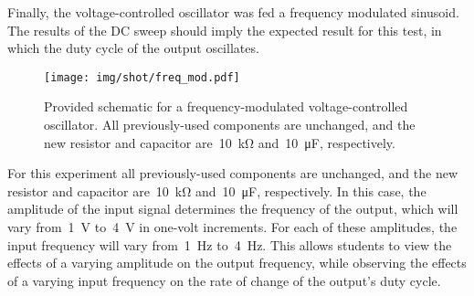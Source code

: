 Finally, the voltage-controlled oscillator was fed a frequency modulated
sinusoid.  The results of the DC sweep should imply the expected result for
this test, in which the duty cycle of the output oscillates.
%
\begin{figure}[H]
	\centering
	\texttt{[image: img/shot/freq\_mod.pdf]}
	\parbox{.6\textwidth}{
	\caption{Provided schematic for a frequency-modulated voltage-controlled
	oscillator.  All previously-used components are unchanged, and the new
	resistor and capacitor are~\SI{10}{\kilo\ohm} and~\SI{10}{\micro\farad},
	respectively.}
	\label{fig:freq_mod}}
\end{figure}
%
For this experiment all previously-used components are unchanged, and the new
resistor and capacitor are~\SI{10}{\kilo\ohm} and~\SI{10}{\micro\farad},
respectively.  In this case, the amplitude of the input signal determines the
frequency of the output, which will vary from~\SI{1}{\volt} to~\SI{4}{\volt} in
one-volt increments.  For each of these amplitudes, the input frequency will
vary from~\SI{1}{\hertz} to~\SI{4}{\hertz}.  This allows students to view the
effects of a varying amplitude on the output frequency, while observing the
effects of a varying input frequency on the rate of change of the output's duty
cycle.
